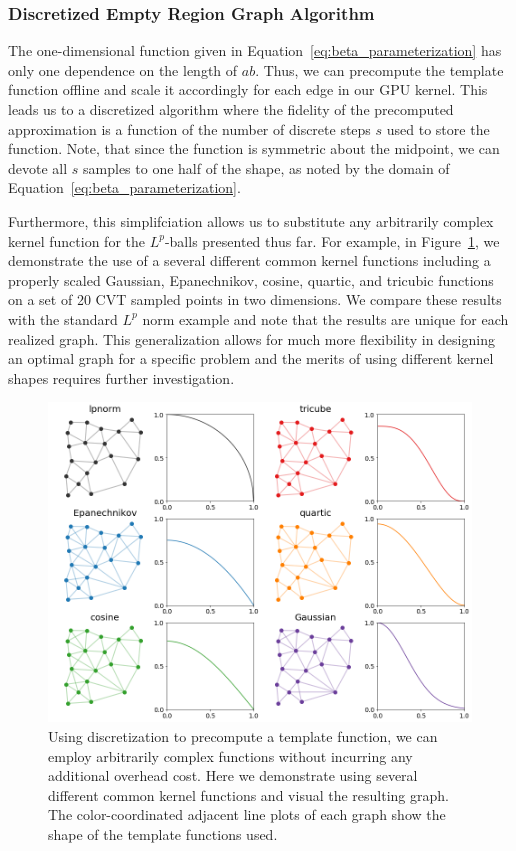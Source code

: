 \subsubsection{Discretized Empty Region Graph Algorithm}
\label{sec:gpu_bp_discrete}

The one-dimensional function given in Equation~\ref{eq:beta_parameterization} has only one dependence on the length of $ab$.
%
Thus, we can precompute the template function offline and scale it accordingly for each edge in our GPU kernel.
%
This leads us to a discretized algorithm where the fidelity of the precomputed approximation is a function of the number of discrete steps $s$ used to store the function.
%
Note, that since the function is symmetric about the midpoint, we can devote all $s$ samples to one half of the shape, as noted by the domain of Equation~\ref{eq:beta_parameterization}.

Furthermore, this simplifciation allows us to substitute any arbitrarily complex kernel function for the $L^p$-balls presented thus far.
%
For example, in Figure~\ref{fig:discrete_beta}, we demonstrate the use of a several different common kernel functions including a properly scaled Gaussian, Epanechnikov, cosine, quartic, and tricubic functions on a set of 20 CVT sampled points in two dimensions.
%
We compare these results with the standard $L^p$ norm example and note that the results are unique for each realized graph.
%
This generalization allows for much more flexibility in designing an optimal graph for a specific problem and the merits of using different kernel shapes requires further investigation.

\begin{figure}[htbp]
    \includegraphics[width=\linewidth]{figs/chap7/beta_shapes.png}
    \caption{Using discretization to precompute a template function, we can employ arbitrarily complex functions without incurring any additional overhead cost.
    Here we demonstrate using several different common kernel functions and visual the resulting graph.
    The color-coordinated adjacent line plots of each graph show the shape of the template functions used.}
    \label{fig:discrete_beta}
\end{figure}

